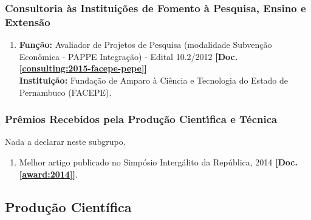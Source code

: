 \documentclass[a4paper,oneside,10pt]{article}
\begin{document}

\subsubsection{Consultoria \`{a}s Institui\c{c}\~{o}es de Fomento \`{a} Pesquisa, Ensino e Extens\~{a}o}
\vspace{0.3cm}

\begin{enumerate}
\renewcommand{\labelenumi}{{\large\bfseries\arabic{enumi}.}}

\item   \textbf{Fun\c{c}\~{a}o:} Avaliador de Projetos de Pesquisa (modalidade Subven\c{c}\~{a}o Econ\^{o}mica - PAPPE Integra\c{c}\~{a}o) - Edital 10.2/2012 \textbf{[Doc. \ref{consulting:2015-facepe-pepe}]}\\
        \textbf{Institui\c{c}\~{a}o:} Fundação de Amparo à Ciência e Tecnologia do Estado de Pernambuco (FACEPE).

\end{enumerate}


\subsubsection{Pr\^{e}mios Recebidos pela Produ\c{c}\~{a}o Cient\'{\i}fica e T\'{e}cnica}
\vspace{0.3cm}

Nada a declarar neste subgrupo.

\begin{enumerate}
\renewcommand{\labelenumi}{{\large\bfseries\arabic{enumi}.}}

\item Melhor artigo publicado no Simpósio Intergálito da República, 2014 \textbf{[Doc. \ref{award:2014}]}.

\end{enumerate}


\subsection{Produção Científica}
\vspace{0.3cm}
\end{document}
